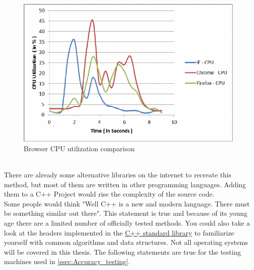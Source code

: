 \begin{figure}[h]
	\centering
	\includegraphics[scale=0.25]{figures/einleitung/browser_comparisson.png}
	\caption{Browser CPU utilization comparison\cite{6724273}}
	\label{browser_comp}
\end{figure}
\\
There are already some alternative libraries on the internet to recreate this method, but most of them are written in other programming languages. Adding them to a C++ Project would rise the complexity of the source code.\\
Some people would think "Well C++ is a new and modern language. There must be something similar out there". This statement is true and because of its young age there are a limited number of officially tested methods. You could also take a look at the headers implemented in the \href{https://en.cppreference.com/w/cpp/header}{C++ standard library} \cite{CppRef} to familiarize yourself with common algorithms and data structures.
Not all operating systems will be covered in this thesis.
The following statements are true for the testing machines used in \autoref{ssec:Accuracy_testing}.
